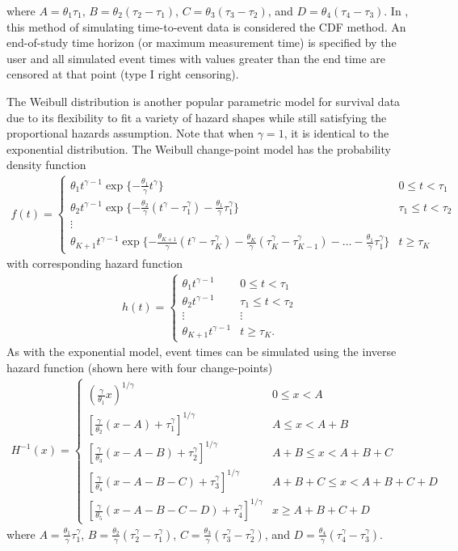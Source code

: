%
where $A=\theta_1\tau_1$, $B=\theta_2(\tau_2-\tau_1)$, $C=\theta_3(\tau_3-\tau_2)$, and $D=\theta_4(\tau_4-\tau_3)$. In , this method of simulating time-to-event data is considered the CDF method. An end-of-study time horizon (or maximum measurement time) is specified by the user and all simulated event times with values greater than the end time are censored at that point (type I right censoring).

The Weibull distribution is another popular parametric model for survival data due to its flexibility to fit a variety of hazard shapes while still satisfying the proportional hazards assumption. Note that when $\gamma=1$, it is identical to the exponential distribution. The Weibull change-point model has the probability density function
%
\begin{align}
f(t)=\begin{cases}
\theta_1 t^{\gamma-1}\exp\{-\frac{\theta_1}{\gamma}t^\gamma\} & 0\leq t<\tau_1\\
\theta_2 t^{\gamma-1}\exp\{-\frac{\theta_2}{\gamma}(t^\gamma-\tau_1^{\gamma})-\frac{\theta_1}{\gamma}\tau_1^{\gamma}\} & \tau_1\leq t<\tau_2\\
\vdots \\
\theta_{K+1} t^{\gamma-1}\exp\{-\frac{\theta_{K+1}}{\gamma}(t^\gamma-\tau_K^{\gamma})-\frac{\theta_K}{\gamma}(\tau_K^{\gamma}-\tau_{K-1}^{\gamma})-\ldots-\frac{\theta_1}{\gamma}\tau_1^\gamma\} & t\geq\tau_K
\end{cases}
\label{weibull pdf}
\end{align}
%
with corresponding hazard function
%
\begin{align}
	h(t)=\begin{cases}
	\theta_1 t^{\gamma-1} & 0\leq t<\tau_1\\
	\theta_2 t^{\gamma-1} & \tau_1\leq t<\tau_2 \\
	\vdots & \vdots \\
	\theta_{K+1} t^{\gamma-1} & t\geq\tau_K.
	\end{cases}
\end{align}
%
As with the exponential model, event times can be simulated using the inverse hazard function (shown here with four change-points)
%
\begin{align}
H^{-1}(x)=\begin{cases}
(\frac{\gamma}{\theta_1}x)^{1/\gamma} & 0\leq x<A\\
[\frac{\gamma}{\theta_2}(x-A)+\tau_1^{\gamma}]^{1/\gamma} & A\leq x<A+B\\
[\frac{\gamma}{\theta_3}(x-A-B)+\tau_2^\gamma]^{1/\gamma} & A+B\leq x<A+B+C\\
[\frac{\gamma}{\theta_4}(x-A-B-C)+\tau_3^\gamma]^{1/\gamma} & A+B+C\leq x<A+B+C+D\\
[\frac{\gamma}{\theta_5}(x-A-B-C-D)+\tau_4^\gamma]^{1/\gamma} & 
x\geq A+B+C+D
\end{cases}
\end{align}
%
where $A=\frac{\theta_1}{\gamma}\tau_1^{\gamma}$, $B=\frac{\theta_2}{\gamma}(\tau_2^\gamma-\tau_1^\gamma)$, $C=\frac{\theta_3}{\gamma}(\tau_3^\gamma-\tau_2^\gamma)$, and $D=\frac{\theta_4}{\gamma}(\tau_4^\gamma-\tau_3^\gamma)$. 

